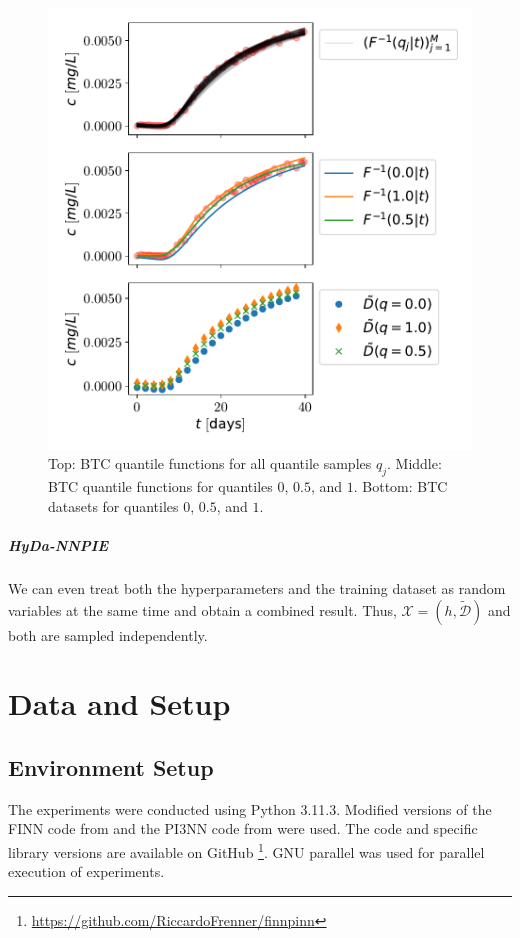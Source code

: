 \begin{figure}[h]
    \centering
    \includegraphics{figs/btc_dataspan_quantiles.pdf}
    \caption{Top: BTC quantile functions for all quantile samples $q_j$. Middle: BTC quantile functions for quantiles $0$, $0.5$, and $1$. Bottom: BTC datasets for quantiles $0$, $0.5$, and $1$.}
    \label{fig:btc_dataspan_quantiles}
\end{figure}



\paragraph{HyDa-NNPIE}

We can even treat both the hyperparameters and the training dataset as random variables at the same time and obtain a combined result. Thus, $\mathcal{X} = (h, \tilde{\mathcal{D}})$ and both are sampled independently.



\chapter{Data and Setup}
\label{sec:data_and_setup}
\section{Environment Setup}
The experiments were conducted using Python 3.11.3. Modified versions of the FINN code from \citet{finn} and the PI3NN code from \citet{pi3nn} were used. The code and specific library versions are available on GitHub \footnote{\url{https://github.com/RiccardoFrenner/finnpinn}}. GNU parallel \cite{tange_2023_10199085} was used for parallel execution of experiments.

